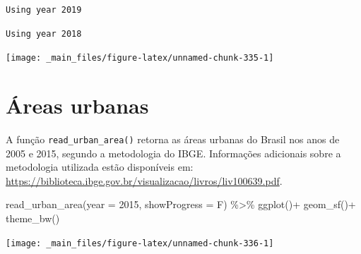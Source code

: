 \documentclass[
  brazilian,
]{book}
\newenvironment{Shaded}{\begin{snugshade}}{\end{snugshade}}
\newcommand{\AttributeTok}[1]{\textcolor[rgb]{0.77,0.63,0.00}{#1}}
\newcommand{\DecValTok}[1]{\textcolor[rgb]{0.00,0.00,0.81}{#1}}
\newcommand{\FunctionTok}[1]{\textcolor[rgb]{0.00,0.00,0.00}{#1}}
\newcommand{\NormalTok}[1]{#1}
\newcommand{\SpecialCharTok}[1]{\textcolor[rgb]{0.00,0.00,0.00}{#1}}
\begin{document}
\begin{verbatim}
Using year 2019
\end{verbatim}

\begin{verbatim}
Using year 2018
\end{verbatim}

\begin{center}\texttt{[image: \_main\_files/figure-latex/unnamed-chunk-335-1]} \end{center}

\hypertarget{uxe1reas-urbanas}{%
\section{Áreas urbanas}\label{uxe1reas-urbanas}}

A função \texttt{read\_urban\_area()} retorna as áreas urbanas do Brasil nos anos de 2005 e 2015, segundo a metodologia do IBGE. Informações adicionais sobre a metodologia utilizada estão disponíveis em: \url{https://biblioteca.ibge.gov.br/visualizacao/livros/liv100639.pdf}.

\begin{Shaded}
\begin{Highlighting}[]
\FunctionTok{read\_urban\_area}\NormalTok{(}\AttributeTok{year =} \DecValTok{2015}\NormalTok{,}
                \AttributeTok{showProgress =}\NormalTok{ F) }\SpecialCharTok{\%\textgreater{}\%} 
  \FunctionTok{ggplot}\NormalTok{()}\SpecialCharTok{+}
  \FunctionTok{geom\_sf}\NormalTok{()}\SpecialCharTok{+}
  \FunctionTok{theme\_bw}\NormalTok{()}
\end{Highlighting}
\end{Shaded}

\begin{center}\texttt{[image: \_main\_files/figure-latex/unnamed-chunk-336-1]} \end{center}
\end{document}
